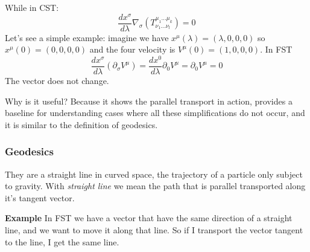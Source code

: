 While in CST:
\[
\frac{dx^{\sigma }}{d\lambda } \nabla _{\sigma } \left(T^{\mu _{1}\ldots \mu _{k}}_{\nu _{1}\ldots \nu _{l}} \right) = 0
\]
Let's see a simple example: imagine we have $x^{\mu }\left( \lambda  \right) = \left( \lambda , 0, 0 , 0 \right)$ so $x^{\mu }\left( 0 \right) = \left( 0,0,0,0 \right)$ and the four velocity is $V^{\mu }\left( 0 \right) = \left( 1,0,0,0 \right)$.
In FST 
\[
\frac{dx^{\sigma }}{d\lambda } \left( \partial_{\sigma }V^{\mu } \right) = \frac{dx^{0}}{d\lambda } \partial_{0}V^{\mu } = \partial_{0}V^{\mu } = 0
\]
The vector does not change. \par

Why is it useful? Because it shows the parallel transport in action, provides a baseline for understanding cases where all these simplifications do not occur, and it is similar to the definition of geodesics. 
\subsubsection{Geodesics}
They are a straight line in curved space, the trajectory of a particle only subject to gravity. With \emph{straight line} we mean the path that is parallel transported along it's tangent vector.

\textbf{Example} In FST we have a vector that have the same direction of a straight line, and we want to move it along that line. 
So if I transport the vector tangent to the line, I get the same line.

\label{imm:straigthline}

